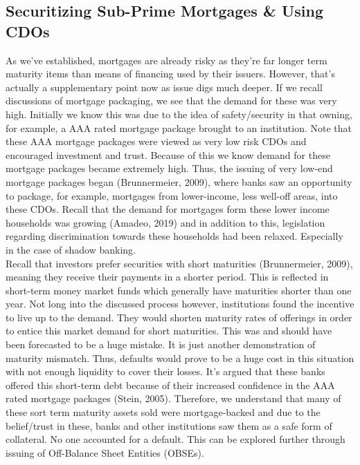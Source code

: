 \documentclass[11pt, english]{article}
\begin{document}
	\subsection{Securitizing Sub-Prime Mortgages \& Using CDOs}

	As we've established, mortgages are already risky as they're far longer term maturity items than means of financing used by their issuers. However, that's actually a supplementary point now as issue digs much deeper. If we recall discussions of mortgage packaging, we see that the demand for these was very high. Initially we know this was due to the idea of safety/security in that owning, for example, a AAA rated mortgage package brought to an institution. Note that these AAA mortgage packages were viewed as very low risk CDOs and encouraged investment and trust. Because of this we know demand for these mortgage packages became extremely high. Thus, the issuing of very low-end mortgage packages began (Brunnermeier, 2009), where banks saw an opportunity to package, for example, mortgages from lower-income, less well-off areas, into these CDOs. Recall that the demand for mortgages form these lower income households was growing (Amadeo, 2019) and in addition to this, legislation regarding discrimination towards these households had been relaxed. Especially in the case of shadow banking.\\

	Recall that investors prefer securities with short maturities (Brunnermeier, 2009), meaning they receive their payments in a shorter period. This is reflected in short-term money market funds which generally have maturities shorter than one year. Not long into the discussed process however, institutions found the incentive to live up to the demand. They would shorten maturity rates of offerings in order to entice this market demand for short maturities. This was and should have been forecasted to be a huge mistake. It is just another demonstration of maturity mismatch. Thus, defaults would prove to be a huge cost in this situation with not enough liquidity to cover their losses. It's argued that these banks offered this short-term debt because of their increased confidence in the AAA rated mortgage packages (Stein, 2005). Therefore, we understand that many of these sort term maturity assets sold were mortgage-backed and due to the belief/trust in these, banks and other institutions saw them as a safe form of collateral. No one accounted for a default. This can be explored further through issuing of Off-Balance Sheet Entities (OBSEs).
\end{document}

